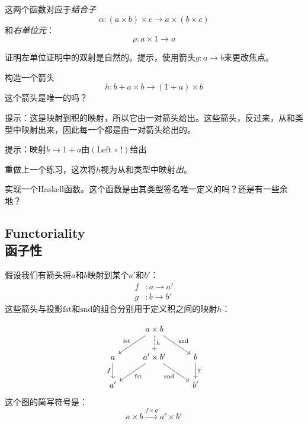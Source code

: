 \documentclass[DaoFP]{subfiles}
\begin{document}
 这两个函数对应于\emph{结合子}
 \[ \alpha \colon (a \times b) \times c \to a \times (b \times c) \]
 和\emph{右单位元}：
 \[ \rho \colon a \times 1 \to a \]

 \begin{exercise}
  证明左单位证明中的双射是自然的。提示，使用箭头$g \colon a \to b$来更改焦点。
 \end{exercise}

 \begin{exercise}
  构造一个箭头
  \[ h \colon b + a \times b \to (1 + a) \times b \]
  这个箭头是唯一的吗？

  提示：这是映射到积的映射，所以它由一对箭头给出。这些箭头，反过来，从和类型中映射出来，因此每一个都是由一对箭头给出的。

  提示：映射$b \to 1 + a$由$(\text{Left} \, \circ \, !)$给出
 \end{exercise}

 \begin{exercise}
  重做上一个练习，这次将$h$视为从和类型中映射\emph{出}。
 \end{exercise}

 \begin{exercise}
  实现一个Haskell函数。这个函数是由其类型签名唯一定义的吗？还是有一些余地？
 \end{exercise}

 \subsection{Functoriality\\函子性}

 假设我们有箭头将$a$和$b$映射到某个$a'$和$b'$：
 \begin{align*}
  f &\colon a \to a' \\
  g &\colon b \to b'
 \end{align*}
 这些箭头与投影$\text{fst}$和$\text{snd}$的组合分别用于定义积之间的映射$h$：

 \[
  \begin{tikzcd}
   & a \times b
   \arrow[d, dashed, "h"]
   \arrow[dl,  "\text{fst}"']
   \arrow[dr,   "\text{snd}"]
   \\
   a
   \arrow[d, "f"']
   &a' \times b'
   \arrow[dl,  "\text{fst}"]
   \arrow[dr,   "\text{snd}"']
   & b
   \arrow[d, "g"]
   \\
   a' && b'
  \end{tikzcd}
 \]
 这个图的简写符号是：
 \[ a \times b \xrightarrow{f \times g} a' \times b' \]
\end{document}
